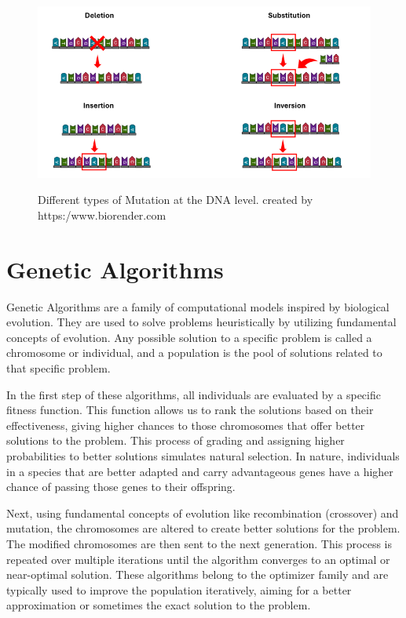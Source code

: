 \documentclass[12pt]{article}
\begin{document}
\begin{figure}[H]
\centering
\includegraphics[scale=1]{Picture4}\\
\caption{Different types of Mutation at the DNA level. created by https:/www.biorender.com}
\end{figure}



\section{Genetic Algorithms}

Genetic Algorithms are a family of computational models inspired by biological evolution. They are used to solve problems heuristically by utilizing fundamental concepts of evolution. Any possible solution to a specific problem is called a chromosome or individual, and a population is the pool of solutions related to that specific problem.

In the first step of these algorithms, all individuals are evaluated by a specific fitness function. This function allows us to rank the solutions based on their effectiveness, giving higher chances to those chromosomes that offer better solutions to the problem. This process of grading and assigning higher probabilities to better solutions simulates natural selection. In nature, individuals in a species that are better adapted and carry advantageous genes have a higher chance of passing those genes to their offspring.

Next, using fundamental concepts of evolution like recombination (crossover) and mutation, the chromosomes are altered to create better solutions for the problem. The modified chromosomes are then sent to the next generation. This process is repeated over multiple iterations until the algorithm converges to an optimal or near-optimal solution. These algorithms belong to the optimizer family and are typically used to improve the population iteratively, aiming for a better approximation or sometimes the exact solution to the problem.\\[6px]
\end{document}
